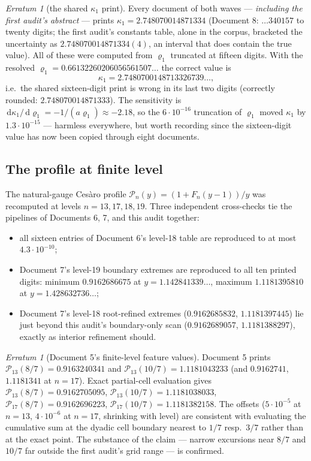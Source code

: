 \documentclass[11pt,oneside]{article}
\theoremstyle{definition}
\theoremstyle{remark}
\newtheorem{erratum}[theorem]{Erratum}
\newcommand{\dd}{\,\mathrm d}
\begin{document}
\begin{erratum}[the shared $\kappa_1$ print]
\label{err:kappa1}
Every document of both waves --- \emph{including the first audit's
abstract} --- prints $\kappa_1=2.748070014871334$ (Document 8:
$\ldots340157$ to twenty digits; the first audit's constants table,
alone in the corpus, bracketed the uncertainty as
$2.748070014871334(4)$, an interval that does contain the true value).
All of these were computed from $\varrho_1$ truncated at fifteen
digits.  With the resolved
$\varrho_1=0.66132260206056561507\ldots$ the correct value is
\[
 \kappa_1=2.7480700148713326739\ldots,
\]
i.e.\ the shared sixteen-digit print is wrong in its last two digits
(correctly rounded: $2.748070014871333$).  The sensitivity is
$\dd\kappa_1/\dd\varrho_1=-1/(a\varrho_1)\approx-2.18$, so the
$6\cdot10^{-16}$ truncation of $\varrho_1$ moved $\kappa_1$ by
$1.3\cdot10^{-15}$ --- harmless everywhere, but worth recording since
the sixteen-digit value has now been copied through eight documents.
\end{erratum}

\subsection{The profile at finite level}
\label{ssec:profile-numerics}

The natural-gauge Ces\`aro profile
$\mathscr P_n(y)=(1+F_n(y-1))/y$ was recomputed at levels
$n=13,17,18,19$.  Three independent cross-checks tie the pipelines of
Documents 6, 7, and this audit together:
\begin{itemize}
\item all sixteen entries of Document 6's level-18 table are reproduced
to at most $4.3\cdot10^{-10}$;
\item Document 7's level-19 boundary extremes are reproduced to all ten
printed digits: minimum $0.9162686675$ at
$y=1.142841339\ldots$, maximum $1.1181395810$ at $y=1.428632736\ldots$;
\item Document 7's level-18 root-refined extremes
($0.9162685832$, $1.1181397445$) lie just beyond this audit's
boundary-only scan ($0.9162689057$, $1.1181388297$), exactly as
interior refinement should.
\end{itemize}

\begin{erratum}[Document 5's finite-level feature values]
\label{err:doc5-features}
Document 5 prints $\mathscr P_{13}(8/7)=0.9163240341$ and
$\mathscr P_{13}(10/7)=1.1181043233$ (and $0.9162741$, $1.1181341$ at
$n=17$).  Exact partial-cell evaluation gives
$\mathscr P_{13}(8/7)=0.9162705095$,
$\mathscr P_{13}(10/7)=1.1181038033$,
$\mathscr P_{17}(8/7)=0.9162696223$,
$\mathscr P_{17}(10/7)=1.1181382158$.  The offsets
($5\cdot10^{-5}$ at $n=13$, $4\cdot10^{-6}$ at $n=17$, shrinking with
level) are consistent with evaluating the cumulative sum at the dyadic
cell boundary nearest to $1/7$ resp.\ $3/7$ rather than at the exact
point.  The substance of the claim --- narrow excursions near $8/7$ and
$10/7$ far outside the first audit's grid range --- is confirmed.
\end{erratum}
\end{document}
